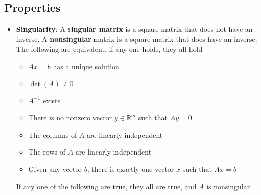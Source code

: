 \documentclass{report}
\begin{document}
    \bigbreak \noindent 
    \subsection{Properties}
    \begin{itemize}
        \item \textbf{Singularity}: A \textbf{singular matrix} is a square matrix that does not have an inverse.
            \bigbreak \noindent 
            A \textbf{nonsingular} matrix is a square matrix that does have an inverse.
            \bigbreak \noindent 
            The following are equivalent, if any one holds, they all hold
            \begin{itemize}
                \item $Ax = b$ has a unique solution
                \item $\det(A)\ne 0$
                \item $A^{-1}$ exists
                \item There is no nonzero vector $y \in \mathbb{R}^{m}$ such that $Ay=0 $
                \item The columns of $A$ are linearly independent
                \item The rows of $A$ are linearly independent
                \item Given any vector $b$, there is exactly one vector $x$ such that $Ax=b$
            \end{itemize}
            If any one of the following are true, they all are true, and $A$ is nonsingular


\end{itemize}
\end{document}
